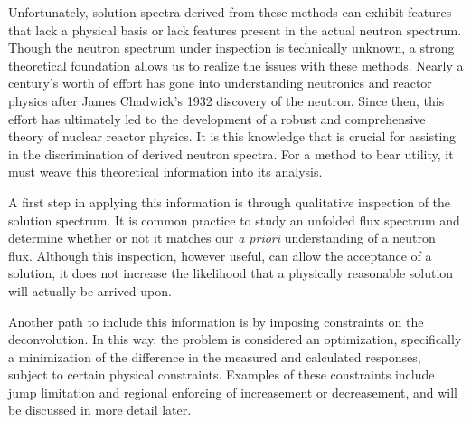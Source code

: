 Unfortunately, solution spectra derived from these methods can exhibit features that lack a physical basis or lack features present in the actual neutron spectrum.
Though the neutron spectrum under inspection is technically unknown, a strong theoretical foundation allows us to realize the issues with these methods.
Nearly a century's worth of effort has gone into understanding neutronics and reactor physics after James Chadwick's 1932 discovery of the neutron.
Since then, this effort has ultimately led to the development of a robust and comprehensive theory of nuclear reactor physics.
It is this knowledge that is crucial for assisting in the discrimination of derived neutron spectra.
For a method to bear utility, it must weave this theoretical information into its analysis.

A first step in applying this information is through qualitative inspection of the solution spectrum.
It is common practice to study an unfolded flux spectrum and determine whether or not it matches our {\it a priori} understanding of a neutron flux.
Although this inspection, however useful, can allow the acceptance of a solution, it does not increase the likelihood that a physically reasonable solution will actually be arrived upon.

Another path to include this information is by imposing constraints on the deconvolution.
In this way, the problem is considered an optimization, specifically a minimization of the difference in the measured and calculated responses, subject to certain physical constraints.
Examples of these constraints include jump limitation and regional enforcing of increasement or decreasement, and will be discussed in more detail later.

